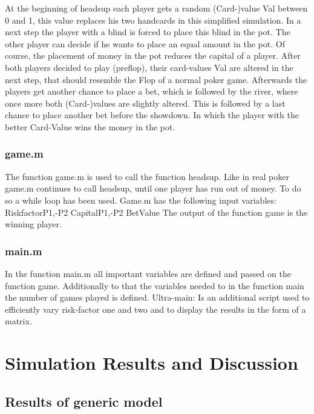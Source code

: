 \documentclass[11pt]{article}
\begin{document}
At the beginning of headsup each player gets a random (Card-)value Val between 0 and 1, this value replaces his two handcards in this simplified simulation. In a next step the player with a blind is forced to place this blind in the pot. The other player can decide if he wants to place an equal amount in the pot.  Of course, the placement of money in the pot reduces the capital of a player. After both players decided to play (preflop), their card-values Val are altered in the next step, that should resemble the Flop of a normal poker game. Afterwards the players get another chance to place a bet, which is followed by the river, where once more both (Card-)values are slightly altered. This is followed by a last chance to place another bet before the showdown. In which the player with the better Card-Value wins the money in the pot.

\subsubsection{game.m}
The function game.m is used to call the function headsup. Like in real poker game.m continues to call headsup, until one player has run out of money. To do so a while loop has been used. Game.m has the following input variables:
RiskfactorP1,-P2
CapitalP1,-P2
BetValue
The output of the function game is the winning player.
\subsubsection{main.m}
In the function main.m all important variables are defined and passed on the function game.
Additionally to that the variables needed to in the function main the number of games played is defined.
Ultra-main: Is an additional script used to efficiently vary risk-factor one and two and to display the results in the form of a matrix.







\section{Simulation Results and Discussion}
\subsection{Results of generic model}
\end{document}
